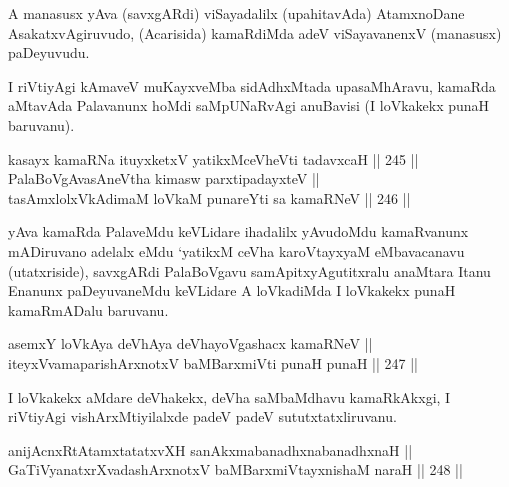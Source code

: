 \begin{artha}
A manasusx yAva (savxgARdi) viSayadalilx (upahitavAda) AtamxnoDane
AsakatxvAgiruvudo, (Acarisida) kamaRdiMda adeV viSayavanenxV (manasusx)
paDeyuvudu.
\end{artha}


\begin{artha}
I riVtiyAgi kAmaveV muKayxveMba sidAdhxMtada upasaMhAravu, kamaRda
aMtavAda Palavanunx hoMdi saMpUNaRvAgi anuBavisi (I loVkakekx punaH
baruvanu).
\end{artha}


\begin{shl}
kasayx kamaRNa ituyxketxV yatikxMceVheVti tadavxcaH \hfill || 245 ||  \\
PalaBoVgAvasAneV\s tha kimasw parxtipadayxteV || \\
tasAmxlolxVkAdimaM loVkaM punareYti sa kamaRNeV \hfill || 246 ||  
\end{shl}

\begin{artha}
yAva kamaRda PalaveMdu keVLidare ihadalilx yAvudoMdu kamaRvanunx
mADiruvano adelalx eMdu `yatikxM ceVha karoVtayxyaM eMbavacanavu
(utatxriside), savxgARdi PalaBoVgavu samApitx\-\break yAgutitxralu anaMtara
Itanu Enanunx paDeyuvaneMdu keVLidare A loVkadiMda I loVkakekx punaH
kamaRmADalu baruvanu.
\end{artha}


\begin{shl}
asemxY loVkAya deVhAya deVhayoVgashacx kamaRNeV || \\
iteyxVvamaparishArxnotxV baMBarxmiVti punaH punaH \hfill || 247 ||  
\end{shl}

\begin{artha}
I loVkakekx aMdare deVhakekx, deVha saMbaMdhavu kamaRkAkxgi, I
riVtiyAgi vishArxMtiyilalxde padeV padeV sututxtatxliruvanu.
\end{artha}


\begin{shl}
anijAcnxRtAtamxtatatxvXH sanAkxmabanadhxnabanadhxnaH || \\
GaTiVyanatxrXvadashArxnotxV baMBarxmiVtayxnishaM naraH \hfill || 248 ||  
\end{shl}

